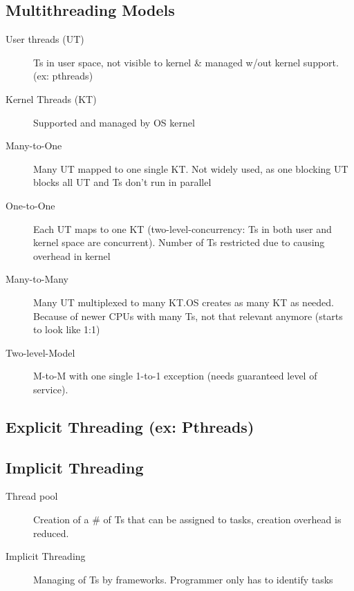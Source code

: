 \subsection*{Multithreading Models}
\begin{description}
    \item[User threads (UT)] Ts in user space, not visible to kernel \& managed w/out kernel support. (ex: pthreads)
  \item[Kernel Threads (KT)] Supported and managed by OS kernel
  \item[Many-to-One] Many UT mapped to one single KT. Not widely used, as one blocking UT blocks all UT and Ts don't run in parallel
  \item[One-to-One] Each UT maps to one KT (two-level-concurrency: Ts in both user and kernel space are concurrent). Number of Ts restricted due to causing overhead in kernel
  \item[Many-to-Many] Many UT multiplexed to many KT.OS creates as many KT as needed. Because of newer CPUs with many Ts, not that relevant anymore (starts to look like 1:1)
  \item[Two-level-Model] M-to-M with one single 1-to-1 exception (needs guaranteed level of service).
\end{description}

\subsection*{Explicit Threading (ex: Pthreads)} %

\subsection*{Implicit Threading}
\begin{description}
  \item[Thread pool] Creation of a # of Ts that can be assigned to tasks, creation overhead is reduced.
  \item[Implicit Threading] Managing of Ts by frameworks. Programmer only has to identify tasks
\end{description}

